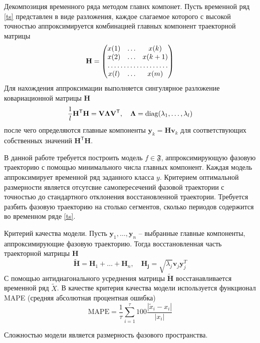 \documentclass[12pt, twoside]{article}
\begin{document}
Декомпозиция временного ряда методом главнх компонет. Пусть временной ряд \eqref{ts} представлен в виде разложения, каждое слагаемое которого с высокой точностью аппроксимируется комбинацией главных компонент траекторной матрицы
    \[ \mathbf{H} = \begin{pmatrix}
                        x(1) & \dots & x(k) \\
                        x(2) & \dots & x(k+1) \\
                        \hdotsfor{3} \\
                        x(l) & \dots & x(m)
                    \end{pmatrix}\]
Для нахождения аппроксимации выполняется сингулярное разложение ковариационной матрицы $\mathbf{H}$
    \[ \frac{1}{l}\mathbf{H}^{\mathsf{T}}\mathbf{H} = \mathbf{V}\mathbf{\Lambda}\mathbf{V}^{\mathsf{T}}, \quad \mathbf{\Lambda} = \diag(\lambda_1,\dots,\lambda_l) \]
    после чего определяются главные компоненты $\mathbf{y}_k = \mathbf{Hv}_k$ для соответствующих собственных значений $\mathbf{H}^{\mathsf{T}}\mathbf{H}$.

В данной работе требуется построить модель $f\in\mathfrak{F}$, аппроксимирующую фазовую траекторию с помощью минимального числа главных компонент. Каждая модель аппроксимирует временной ряд заданного класса $y$. Критерием оптимальной размерности является отсутсвие самопересечений фазовой траектории с точностью до стандартного отклонения восстановленной траектории. Требуется разбить фазовую траекторию на столько сегментов, сколько периодов содержится во временном ряде \eqref{ts}.
    \begin{figure}[ht]
    \end{figure}

Критерий качества модели. Пусть $\mathbf{y}_1,\dots,\mathbf{y}_n$ -- выбранные главные компоненты, аппроксимирующие фазовую траекторию. Тогда восстановленная часть траекторной матрицы $\mathbf{H}$
    \[ \mathbf{\widetilde{H}} = \mathbf{H}_1  + \dots + \mathbf{H}_n, \quad \mathbf{H_j} = \sqrt{\lambda_j}\mathbf{v}_j\mathbf{y}_j^T\]
С помощью антидиагонального усреднения матрицы $\mathbf{\tilde{H}}$ восстанавливается временной ряд $\tilde{X}$. В качестве критерия качества модели используется функционал MAPE (средняя абсолютная процентная ошибка)
    \[ \text{MAPE} = \frac{1}{\tau}\sum_{i = 1}^{\tau}100\frac{|\tilde{x}_i - x_i|}{|x_i|} \]
    
Сложностью модели является размерность фазового пространства.
    \begin{figure}[ht]
    \end{figure}
    
\end{document}
